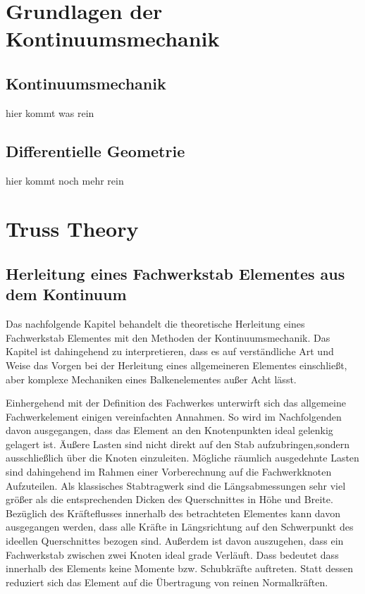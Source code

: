 \documentclass[german,a4paper,12pt,oneside]{scrbook}
\theoremstyle{definition}
\theoremstyle{definition}
\theoremstyle{definition}
\theoremstyle{definition}
\theoremstyle{definition}
\theoremstyle{definition}
\begin{document}

\chapter{Grundlagen der Kontinuumsmechanik}
\section{Kontinuumsmechanik}
hier kommt was rein

\section{Differentielle Geometrie}
hier kommt noch mehr rein

\chapter{Truss Theory}  \setcounter{page}{1}   %




\section{Herleitung eines Fachwerkstab Elementes aus dem Kontinuum}


Das nachfolgende Kapitel behandelt die theoretische Herleitung eines Fachwerkstab Elementes
mit den Methoden der Kontinuumsmechanik. Das Kapitel ist dahingehend zu interpretieren, dass es auf
verständliche Art und Weise das Vorgen bei der Herleitung eines allgemeineren Elementes einschließt,
aber komplexe Mechaniken eines Balkenelementes außer Acht lässt.

Einhergehend mit der Definition des Fachwerkes unterwirft sich das allgemeine Fachwerkelement 
einigen vereinfachten Annahmen. So wird im Nachfolgenden davon ausgegangen, dass das Element an den Knotenpunkten ideal gelenkig gelagert ist. Äußere Lasten sind nicht direkt auf den Stab aufzubringen,sondern ausschließlich über die Knoten einzuleiten. Mögliche räumlich ausgedehnte Lasten sind dahingehend im Rahmen einer Vorberechnung auf die Fachwerkknoten Aufzuteilen.  Als klassisches Stabtragwerk sind die Längsabmessungen sehr viel größer als die entsprechenden Dicken des Querschnittes in Höhe und Breite. 
Bezüglich des Kräfteflusses innerhalb des betrachteten Elementes kann davon ausgegangen werden, dass alle Kräfte in Längsrichtung auf den Schwerpunkt des ideellen Querschnittes bezogen sind. Außerdem ist davon auszugehen, dass ein Fachwerkstab zwischen zwei Knoten ideal grade Verläuft. Dass bedeutet dass innerhalb des Elements keine Momente bzw. Schubkräfte auftreten. Statt dessen reduziert sich das Element auf die Übertragung von reinen Normalkräften.
\end{document}
